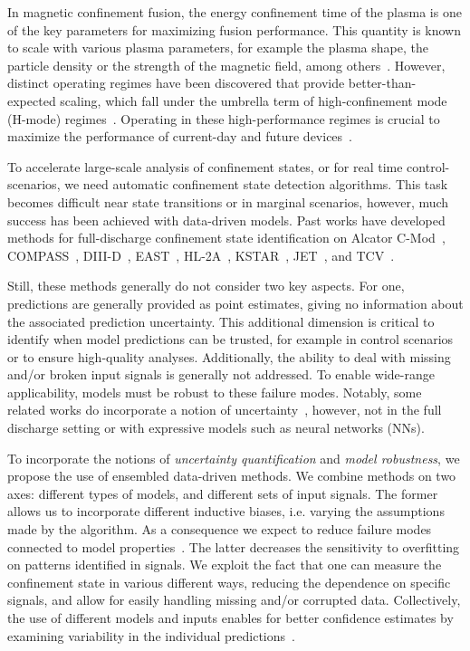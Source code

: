 In magnetic confinement fusion, the energy confinement time of the plasma is one of the key parameters for maximizing fusion performance. This quantity is known to scale with various plasma parameters, for example the plasma shape, the particle density or the strength of the magnetic field, among others~\cite{itpascaling1990}. However, distinct operating regimes have been discovered that provide better-than-expected scaling, which fall under the umbrella term of high-confinement mode (H-mode) regimes~\cite{hmode1982}. Operating in these high-performance regimes is crucial to maximize the performance of current-day and future devices~\cite{hmodeiter2008}.

To accelerate large-scale analysis of confinement states, or for real time control-scenarios, we need automatic confinement state detection algorithms. This task becomes difficult near state transitions or in marginal scenarios, however, much success has been achieved with data-driven models. Past works have developed methods for full-discharge confinement state identification on Alcator C-Mod~\cite{mathews2019}, COMPASS~\cite{zorek2022}, DIII-D~\cite{orozco2022,gill2024}, EAST~\cite{yang2024}, HL-2A~\cite{he2024}, KSTAR~\cite{shin2018,shin2020}, JET~\cite{meakins2010,gonzalez2012}, and TCV~\cite{matoslhd2020,matoslhd2021}. 

Still, these methods generally do not consider two key aspects. For one, predictions are generally provided as point estimates, giving no information about the associated prediction uncertainty. This additional dimension is critical to identify when model predictions can be trusted, for example in control scenarios or to ensure high-quality analyses. Additionally, the ability to deal with missing and/or broken input signals is generally not addressed. To enable wide-range applicability, models must be robust to these failure modes. Notably, some related works do incorporate a notion of uncertainty~\cite{gonzalez2012,verdoolaege2012,verdoolaege2012ppcf}, however, not in the full discharge setting or with expressive models such as neural networks (NNs). 

To incorporate the notions of \textit{uncertainty quantification} and \textit{model robustness}, we propose the use of ensembled data-driven methods. We combine methods on two axes: different types of models, and different sets of input signals. The former allows us to incorporate different inductive biases, i.e. varying the assumptions made by the algorithm. As a consequence we expect to reduce failure modes connected to model properties~\cite{strauss2018,kariyappa2019}. The latter decreases the sensitivity to overfitting on patterns identified in signals. We exploit the fact that one can measure the confinement state in various different ways, reducing the dependence on specific signals, and allow for easily handling missing and/or corrupted data. Collectively, the use of different models and inputs enables for better confidence estimates by examining variability in the individual predictions~\cite{lakshminarayanan2017,rahaman2021uncertainty}.


